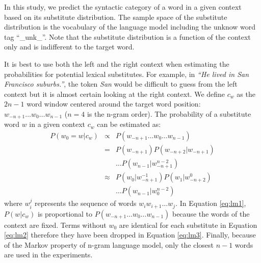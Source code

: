 
\appendix

\label{sec:subcomp}

In this study, we predict the syntactic category of a word in a given
context based on its substitute distribution.  The sample space of the
substitute distribution is the vocabulary of the language model
including the unknow word tag ``\_unk\_''.  Note that the substitute
distribution is a function of the context only and is indifferent to
the target word.


It is best to use both the left and the right context when estimating
the probabilities for potential lexical substitutes.  For example, in
\emph{``He lived in San Francisco suburbs.''}, the token \emph{San}
would be difficult to guess from the left context but it is almost
certain looking at the right context.  We define $c_w$ as the $2n-1$
word window centered around the target word position: $w_{-n+1} \ldots
w_0 \ldots w_{n-1}$ ($n=4$ is the n-gram order).  The probability of a
substitute word $w$ in a given context $c_w$ can be estimated as:
\begin{eqnarray}
  \label{eq:lm1}P(w_0 = w | c_w) & \propto & P(w_{-n+1}\ldots w_0\ldots w_{n-1})\\
  \label{eq:lm2}& = & P(w_{-n+1})P(w_{-n+2}|w_{-n+1})\nonumber\\
  &&\ldots P(w_{n-1}|w_{-n+1}^{n-2})\\
  \label{eq:lm3}& \approx & P(w_0| w_{-n+1}^{-1})P(w_{1}|w_{-n+2}^0)\nonumber\\
  &&\ldots P(w_{n-1}|w_0^{n-2})
\end{eqnarray}
where $w_i^j$ represents the sequence of words $w_i w_{i+1} \ldots
w_{j}$.  In Equation \ref{eq:lm1}, $P(w|c_w)$ is proportional to
$P(w_{-n+1}\ldots w_0 \ldots w_{n-1})$ because the words of the
context are fixed.  Terms without $w_0$ are identical for each
substitute in Equation \ref{eq:lm2} therefore they have been dropped
in Equation \ref{eq:lm3}.  Finally, because of the Markov property of
n-gram language model, only the closest $n-1$ words are used in the
experiments.

